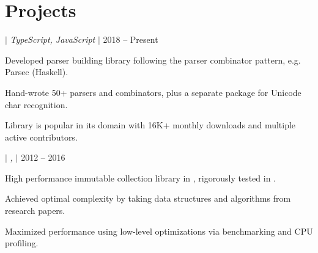 \documentclass[a4paper,11pt]{article}
\begin{document}
\section{Projects}
\begin{sectionList}%
    \begin{project}{\textbf{\parjs} $|$ \emph{TypeScript, JavaScript} $|$ }{2018 -- Present}
        \item Developed parser building library following the parser combinator pattern, e.g. Parsec (Haskell).
        \item Hand-wrote 50+ parsers and combinators, plus a separate package for Unicode char recognition.
        \item Library is popular in its domain with 16K+ monthly downloads and multiple active contributors.
    \end{project}
    \begin{project}{\textbf{\imms} $|$ \emph{, } $|$ }{2012 -- 2016}
        \item High performance immutable collection library in , rigorously tested in .
        \item Achieved optimal complexity by taking data structures and algorithms from research papers.
        \item Maximized performance using low-level optimizations via benchmarking and CPU profiling.
    \end{project}
\end{sectionList}%

\end{document}
